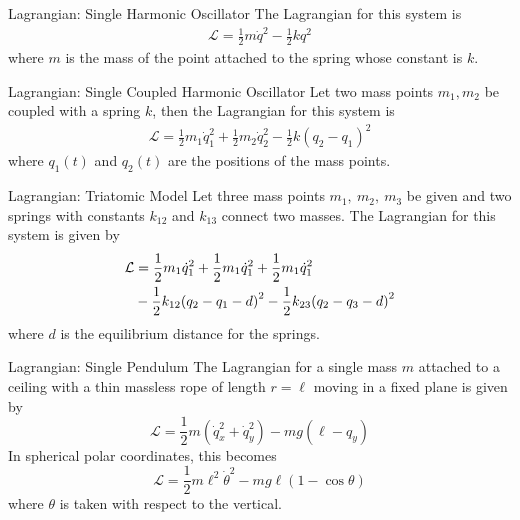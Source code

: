 \documentclass[avery5371,grid]{flashcards}
\begin{document}
\begin{flashcard}[Definition]{Lagrangian: Single Harmonic Oscillator}
	The Lagrangian for this system is
	\begin{align*}
		\mathcal{L} = \frac{1}{2}m\dot{q}^2 - \frac{1}{2}k q^2
	\end{align*}
	where $m$ is the mass of the point attached to the spring whose constant is $k$.
\end{flashcard}

\begin{flashcard}[Definition]{Lagrangian: Single Coupled Harmonic Oscillator}
	Let two mass points $m_1, m_2$ be coupled with a spring $k$, 
	then the Lagrangian for this system is
	\begin{align*}
		\mathcal{L} = \frac{1}{2}m_1 \dot{q}_1^2 + \frac{1}{2}m_2\dot{q}_2^2 - \frac{1}{2}k(q_2-q_1)^2
	\end{align*}
	where $q_1(t)$ and $q_2(t)$ are the positions of the mass points.
\end{flashcard}

\begin{flashcard}[Definition]{Lagrangian: Triatomic Model}
	Let three mass points $m_1,\ m_2,\ m_3$ be given and two springs with constants $k_{12}$ and $k_{13}$ connect two masses. The Lagrangian for this system is given by
	\begin{align*}
		\mathcal{L} &= \frac{1}{2}m_1\dot{q}_1^2 + \frac{1}{2}m_1\dot{q}_1^2 + \frac{1}{2}m_1\dot{q}_1^2 \\
		&- \frac{1}{2}k_{12}\qty(q_2-q_1-d)^2 - \frac{1}{2}k_{23}\qty(q_2-q_3-d)^2
	\end{align*}
	where $d$ is the equilibrium distance for the springs.
\end{flashcard}

\begin{flashcard}[Definition]{Lagrangian: Single Pendulum}
	The Lagrangian for a single mass $m$ attached to a ceiling with a thin massless rope of length $r=\ell$ moving in a fixed plane is given by
	\begin{equation*}
		\mathcal{L} = \frac{1}{2}m(\dot{q}_x^2 + \dot{q}_y^2) - m g(\ell-q_y)
	\end{equation*}
	In spherical polar coordinates, this becomes 
	\begin{equation*}
		\mathcal{L} = \frac{1}{2}m\ell^2\dot{\theta}^2 - m g\ell(1-\cos\theta)
	\end{equation*}
	where $\theta$ is taken with respect to the vertical.
\end{flashcard}
\end{document}
